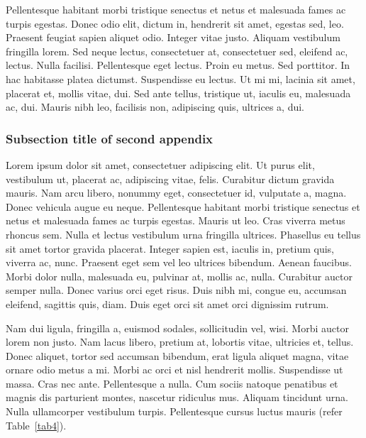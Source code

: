 \documentclass[CJCE,STIX2COL]{WileyNJD-v2}
\begin{document}
Pellentesque habitant morbi tristique senectus et netus et malesuada fames ac turpis egestas. Donec odio elit,
dictum in, hendrerit sit amet, egestas sed, leo. Praesent feugiat sapien aliquet odio. Integer vitae justo. Aliquam
vestibulum fringilla lorem. Sed neque lectus, consectetuer at, consectetuer sed, eleifend ac, lectus. Nulla facilisi.
Pellentesque eget lectus. Proin eu metus. Sed porttitor. In hac habitasse platea dictumst. Suspendisse eu lectus. Ut
mi mi, lacinia sit amet, placerat et, mollis vitae, dui. Sed ante tellus, tristique ut, iaculis eu, malesuada ac, dui.
Mauris nibh leo, facilisis non, adipiscing quis, ultrices a, dui.

\subsubsection{Subsection title of second appendix\label{app2.1.1a}}

Lorem ipsum dolor sit amet, consectetuer adipiscing elit. Ut purus elit, vestibulum ut, placerat ac, adipiscing vitae,
felis. Curabitur dictum gravida mauris. Nam arcu libero, nonummy eget, consectetuer id, vulputate a, magna. Donec
vehicula augue eu neque. Pellentesque habitant morbi tristique senectus et netus et malesuada fames ac turpis egestas.
Mauris ut leo. Cras viverra metus rhoncus sem. Nulla et lectus vestibulum urna fringilla ultrices. Phasellus eu tellus
sit amet tortor gravida placerat. Integer sapien est, iaculis in, pretium quis, viverra ac, nunc. Praesent eget sem vel
leo ultrices bibendum. Aenean faucibus. Morbi dolor nulla, malesuada eu, pulvinar at, mollis ac, nulla. Curabitur
auctor semper nulla. Donec varius orci eget risus. Duis nibh mi, congue eu, accumsan eleifend, sagittis quis, diam.
Duis eget orci sit amet orci dignissim rutrum.

Nam dui ligula, fringilla a, euismod sodales, sollicitudin vel, wisi. Morbi auctor lorem non justo. Nam lacus libero,
pretium at, lobortis vitae, ultricies et, tellus. Donec aliquet, tortor sed accumsan bibendum, erat ligula aliquet magna,
vitae ornare odio metus a mi. Morbi ac orci et nisl hendrerit mollis. Suspendisse ut massa. Cras nec ante. Pellentesque
a nulla. Cum sociis natoque penatibus et magnis dis parturient montes, nascetur ridiculus mus. Aliquam tincidunt
urna. Nulla ullamcorper vestibulum turpis. Pellentesque cursus luctus mauris  (refer Table~\ref{tab4}).

\begin{table}[t]%
\end{table}
\end{document}

